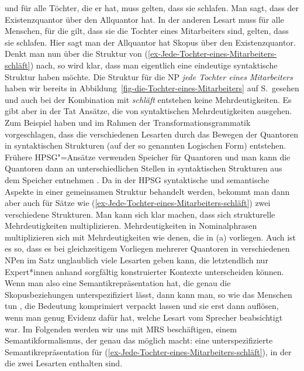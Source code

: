 und für alle Töchter, die er hat, muss gelten, dass sie schlafen. Man sagt, dass der Existenzquantor
 über den Allquantor hat. In der anderen Lesart muss für alle
Menschen, für die gilt, dass sie die Tochter eines Mitarbeiters sind, gelten, dass sie
schlafen. Hier sagt man der Allquantor hat Skopus über den Existenzquantor. Denkt man nun über die
Struktur von (\ref{ex-Jede-Tochter-eines-Mitarbeiters-schläft}) nach, so wird klar, dass man eigentlich eine eindeutige syntaktische
Struktur haben möchte. Die Struktur für die NP \emph{jede Tochter eines Mitarbeiters} haben wir
bereits in Abbildung~\ref{fig-die-Tochter-eines-Mitarbeiters} auf
S.\,\pageref{fig-die-Tochter-eines-Mitarbeiters} gesehen und auch bei der Kombination mit
\emph{schläft} entstehen keine Mehrdeutigkeiten. Es gibt aber in der Tat Ansätze, die
von syntaktischen Mehrdeutigkeiten ausgehen. Zum Beispiel haben \citet{Chomsky76a-u} und
\citet{May77a-u,May85a-u} im Rahmen der Transformationsgrammatik \citep{Chomsky57a,Chomsky81a} vorgeschlagen, dass die verschiedenen Lesarten durch das Bewegen der Quantoren in
syntaktischen Strukturen (auf der so genannten Logischen Form) entstehen. Frühere HPSG"=Ansätze
verwenden Speicher für Quantoren und man kann die Quantoren dann an unterschiedlichen Stellen in
syntaktischen Strukturen aus dem Speicher entnehmen \parencites{Cooper83}[Kapitel~8]{ps2}. Da in der
HPSG syntaktische und semantische Aspekte in einer gemeinsamen Struktur behandelt werden, bekommt
man dann aber auch für Sätze wie (\ref{ex-Jede-Tochter-eines-Mitarbeiters-schläft}) zwei verschiedene Strukturen. Man kann sich klar machen, dass sich strukturelle
Mehrdeutigkeiten multiplizieren. Mehrdeutigkeiten in Nominalphrasen multiplizieren sich mit
Mehrdeutigkeiten wie denen, die in (a) vorliegen. Auch ist es so, dass es bei gleichzeitigem
Vorliegen mehrerer Quantoren in verschiedenen NPen im Satz unglaublich viele Lesarten geben kann, die
letztendlich nur Expert*innen anhand sorgfältig konstruierter Kontexte unterscheiden können. Wenn
man also eine Semantikrepräsentation hat, die genau die Skopusbeziehungen unterspezifiziert lässt, dann kann
man, so wie das Menschen tun \citep{FBF2002a-u,Dwivedi2013a-u,Frances2024a-u}, 
die Bedeutung komprimiert verpackt lassen und sie erst dann
auflösen, wenn man genug Evidenz dafür hat, welche Lesart vom Sprecher beabsichtigt war.
Im Folgenden werden wir uns mit MRS beschäftigen, einem Semantikformalismus, der genau das möglich
macht: eine unterspezifizierte Semantikrepräsentation für (\ref{ex-Jede-Tochter-eines-Mitarbeiters-schläft}), in der die zwei Lesarten
enthalten sind.

